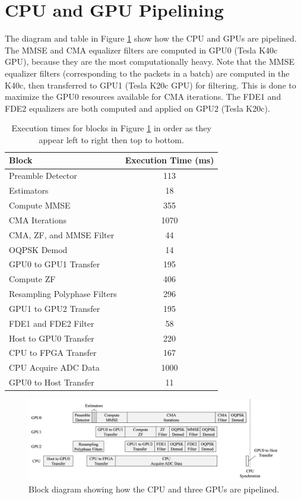 \section{CPU and GPU Pipelining}
The diagram and table in Figure \ref{fig:GPUpipeLines} show how the CPU and GPUs are pipelined.
The MMSE and CMA equalizer filters are computed in GPU0 (Tesla K40c GPU), because they are the most computationally heavy.
Note that the MMSE equalizer filters (corresponding to the packets in a batch) are computed in the K40c, then transferred to GPU1 (Tesla K20c GPU) for filtering.
This is done to maximize the GPU0 resources available for CMA iterations.
The FDE1 and FDE2 equalizers are both computed and applied on GPU2 (Tesla K20c).
\begin{table}
\captionsetup{width=.8\linewidth}
\caption{Execution times for blocks in Figure \ref{fig:GPUpipeLines} in order as they appear left to right then top to bottom.}
\begin{center}
\begin{tabular}{lc}
	\toprule
	Block 					& Execution Time (ms)	\\ \midrule
	Preamble Detector 		& \hphantom{1}113	\\
	Estimators		 		& \hphantom{10}18	\\
	Compute MMSE			& \hphantom{0}355	\\
	CMA Iterations 			& 			  1070		\\
	CMA, ZF, and MMSE Filter& \hphantom{10}44		\\
	OQPSK Demod				& \hphantom{10}14		\\
	GPU0 to GPU1 Transfer	& \hphantom{1}195		\\
	Compute ZF				& \hphantom{1}406	\\
	Resampling Polyphase Filters & \hphantom{1}296	\\
	GPU1 to GPU2 Transfer	& \hphantom{1}195	\\
	FDE1 and FDE2 Filter	& \hphantom{10}58	\\
	Host to GPU0 Transfer	& \hphantom{1}220		\\
	CPU to FPGA Transfer	& \hphantom{1}167	\\
	CPU Acquire ADC Data	&  			   1000		\\
	GPU0 to Host Transfer	& \hphantom{10}11		\\
	\bottomrule
\end{tabular}
\end{center}
\label{tab:pipelineExecutionTimes}
\end{table}
\begin{figure}
\centering\includegraphics[width=15.33in/100*55]{figures/eq_equations/GPUpipeLines.pdf}
	\caption{Block diagram showing how the CPU and three GPUs are pipelined.}
	\label{fig:GPUpipeLines}
\end{figure}

